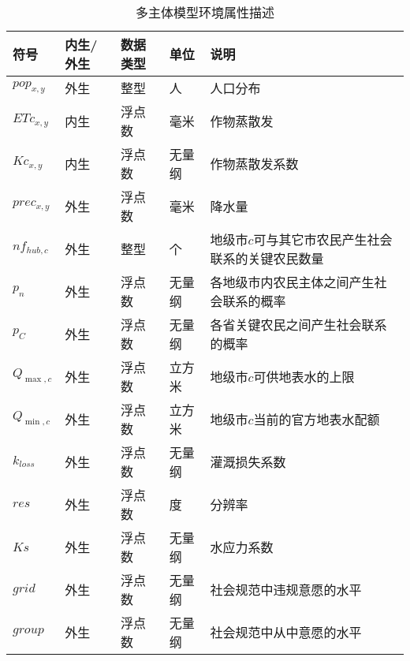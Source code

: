 \begin{table}[htbp]
      \centering
      \caption{多主体模型环境属性描述}
        \begin{tabularx}{\textwidth}{LLLLp{6cm}}
        \toprule
        符号    & 内生/外生 & 数据类型  & 单位    & 说明 \\
        \midrule
        $pop_{x, y}$ & 外生    & 整型    & 人     & 人口分布 \\
        $ETc_{x, y}$ & 内生    & 浮点数   & 毫米    & 作物蒸散发 \\
        $Kc_{x, y}$ & 内生    & 浮点数   & 无量纲   & 作物蒸散发系数 \\
        $prec_{x, y}$ & 外生    & 浮点数   & 毫米    & 降水量 \\
        $nf_{hub, c}$ & 外生    & 整型    & 个     & 地级市$c$可与其它市农民产生社会联系的关键农民数量 \\
        $p_n$ & 外生    & 浮点数   & 无量纲   & 各地级市内农民主体之间产生社会联系的概率 \\
        $p_C$ & 外生    & 浮点数   & 无量纲   & 各省关键农民之间产生社会联系的概率 \\
        ${Q_{\max, c}}$ & 外生    & 浮点数   & 立方米   & 地级市$c$可供地表水的上限 \\
        ${Q_{\min, c}}$ & 外生    & 浮点数   & 立方米   & 地级市$c$当前的官方地表水配额 \\
        $k_{loss}$  & 外生    & 浮点数   & 无量纲   & 灌溉损失系数 \\
        $res$ & 外生    & 浮点数   & 度     & 分辨率 \\
        $Ks$  & 外生    & 浮点数   & 无量纲   & 水应力系数 \\
        $grid$ & 外生    & 浮点数   & 无量纲   & 社会规范中违规意愿的水平 \\
        $group$ & 外生    & 浮点数   & 无量纲   & 社会规范中从中意愿的水平 \\    
        \bottomrule
        \end{tabularx}%
      \label{ch6:tab:visa2.env}%
\end{table}%


